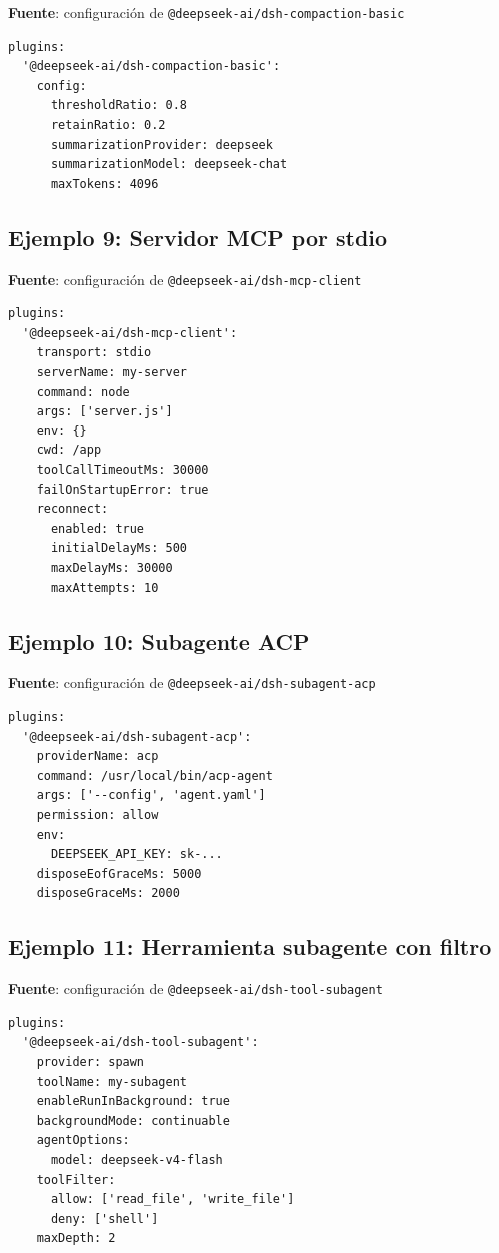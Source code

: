 \documentclass[11pt,a4paper]{article}
\begin{document}
\textbf{Fuente}: configuración de \texttt{@deepseek-ai/dsh-compaction-basic}


\begin{lstlisting}
plugins:
  '@deepseek-ai/dsh-compaction-basic':
    config:
      thresholdRatio: 0.8
      retainRatio: 0.2
      summarizationProvider: deepseek
      summarizationModel: deepseek-chat
      maxTokens: 4096
\end{lstlisting}


\subsection*{Ejemplo 9: Servidor MCP por stdio}


\textbf{Fuente}: configuración de \texttt{@deepseek-ai/dsh-mcp-client}


\begin{lstlisting}
plugins:
  '@deepseek-ai/dsh-mcp-client':
    transport: stdio
    serverName: my-server
    command: node
    args: ['server.js']
    env: {}
    cwd: /app
    toolCallTimeoutMs: 30000
    failOnStartupError: true
    reconnect:
      enabled: true
      initialDelayMs: 500
      maxDelayMs: 30000
      maxAttempts: 10
\end{lstlisting}


\subsection*{Ejemplo 10: Subagente ACP}


\textbf{Fuente}: configuración de \texttt{@deepseek-ai/dsh-subagent-acp}


\begin{lstlisting}
plugins:
  '@deepseek-ai/dsh-subagent-acp':
    providerName: acp
    command: /usr/local/bin/acp-agent
    args: ['--config', 'agent.yaml']
    permission: allow
    env:
      DEEPSEEK_API_KEY: sk-...
    disposeEofGraceMs: 5000
    disposeGraceMs: 2000
\end{lstlisting}


\subsection*{Ejemplo 11: Herramienta subagente con filtro}


\textbf{Fuente}: configuración de \texttt{@deepseek-ai/dsh-tool-subagent}


\begin{lstlisting}
plugins:
  '@deepseek-ai/dsh-tool-subagent':
    provider: spawn
    toolName: my-subagent
    enableRunInBackground: true
    backgroundMode: continuable
    agentOptions:
      model: deepseek-v4-flash
    toolFilter:
      allow: ['read_file', 'write_file']
      deny: ['shell']
    maxDepth: 2
\end{lstlisting}
\end{document}
